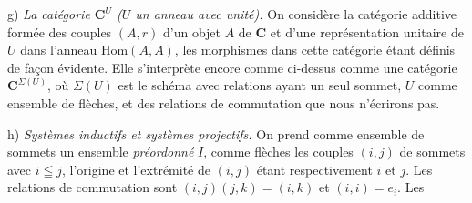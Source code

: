 g) \textit{La catégorie $\mathbf{C}^U$ ($U$ un anneau avec unité).} On
considère la catégorie additive formée des couples $(A,r)$ d'un objet $A$ de
$\mathbf{C}$ et d'une représentation unitaire de $U$ dans l'anneau
$\mathrm{Hom}(A,A)$, les morphismes dans cette catégorie étant définis de
façon évidente. Elle s'interprète encore comme ci-dessus comme une catégorie
$\mathbf{C}^{\Sigma(U)}$, où $\Sigma(U)$ est le schéma avec relations ayant un seul
sommet, $U$ comme ensemble de flèches, et des relations de commutation que nous
n'écrirons pas.

h) \textit{Systèmes inductifs et systèmes projectifs.} On prend
comme ensemble de sommets un ensemble \textit{préordonné} $I$, comme flèches
les couples $(i,j)$ de sommets avec $i\leqq j$, l'origine et l'extrémité de
$(i,j)$ étant respectivement $i$ et $j$. Les relations de commutation sont
$(i,j)(j,k)=(i,k)$ et $(i,i)=e_i$. Les

